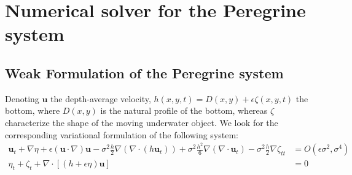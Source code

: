 \documentclass[11pt,a4paper]{article}
\begin{document}
		\pagebreak
	\section{Numerical solver for the Peregrine system}	
		\subsection{Weak Formulation of the Peregrine system}
	Denoting $\mathbf{u}$ the depth-average velocity, $h(x,y,t) = D(x,y) + \epsilon \zeta(x,y,t)$ the bottom, where  $D(x,y)$ is the natural profile of the bottom, whereas $\zeta$ characterize the shape of the moving underwater object. We look for the corresponding variational formulation of the following system: 
	\begin{align}
		\mathbf{u}_t + \nabla \eta + \epsilon (\mathbf{u} \cdot \nabla)\mathbf{u} - \sigma^2\frac{h}{2}\nabla (\nabla \cdot (h \mathbf{u}_t)) + \sigma^2 \frac{h^2}{6}\nabla (\nabla \cdot \mathbf{u}_t) - \sigma^2\frac{h}{2}\nabla \zeta_{tt}  &= O(\epsilon \sigma^2, \sigma^4) \label{Peregrine1}\\
		\eta_t+\zeta_t + \nabla \cdot [(h+\epsilon\eta)\mathbf{u}] &= 0 \label{Peregrine2}
	\end{align}
		
\end{document}
